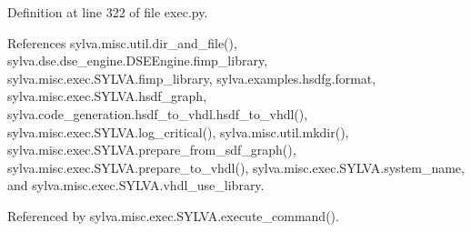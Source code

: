 Definition at line 322 of file exec.\+py.



References sylva.\+misc.\+util.\+dir\+\_\+and\+\_\+file(), sylva.\+dse.\+dse\+\_\+engine.\+D\+S\+E\+Engine.\+fimp\+\_\+library, sylva.\+misc.\+exec.\+S\+Y\+L\+V\+A.\+fimp\+\_\+library, sylva.\+examples.\+hsdfg.\+format, sylva.\+misc.\+exec.\+S\+Y\+L\+V\+A.\+hsdf\+\_\+graph, sylva.\+code\+\_\+generation.\+hsdf\+\_\+to\+\_\+vhdl.\+hsdf\+\_\+to\+\_\+vhdl(), sylva.\+misc.\+exec.\+S\+Y\+L\+V\+A.\+log\+\_\+critical(), sylva.\+misc.\+util.\+mkdir(), sylva.\+misc.\+exec.\+S\+Y\+L\+V\+A.\+prepare\+\_\+from\+\_\+sdf\+\_\+graph(), sylva.\+misc.\+exec.\+S\+Y\+L\+V\+A.\+prepare\+\_\+to\+\_\+vhdl(), sylva.\+misc.\+exec.\+S\+Y\+L\+V\+A.\+system\+\_\+name, and sylva.\+misc.\+exec.\+S\+Y\+L\+V\+A.\+vhdl\+\_\+use\+\_\+library.



Referenced by sylva.\+misc.\+exec.\+S\+Y\+L\+V\+A.\+execute\+\_\+command().


